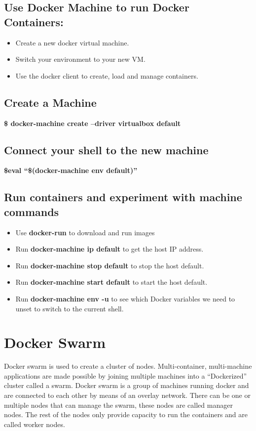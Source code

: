 \documentclass[12pt]{report}
\begin{document}
\subsection{Use Docker Machine to run Docker Containers:}
\begin{itemize}
	\item Create a new docker virtual machine.
	\item Switch your environment to your new VM.
	\item Use the docker client to create, load and manage containers.
\end{itemize}
\subsection{Create a Machine}
\textbf{\$ docker-machine create --driver virtualbox default}
\subsection{Connect your shell to the new machine}
\textbf{\$eval “\$(docker-machine env default)”}
\subsection{Run containers and experiment with machine commands}
\begin{itemize}
	\item Use \textbf{docker-run} to download and run images
	\item Run \textbf{docker-machine ip default} to get the host IP address.
	\item Run \textbf{docker-machine stop default} to stop the host default.
	\item Run \textbf{docker-machine start default} to start the host default.
	\item Run \textbf{docker-machine env -u} to see which Docker variables we need to unset to switch to the current shell.
\end{itemize}
\section{Docker Swarm}
Docker swarm is used to create a cluster of nodes. Multi-container, multi-machine applications are made possible by joining multiple machines into a “Dockerized” cluster called a swarm. Docker swarm is a group of machines running docker and are connected to each other by means of an overlay network. There can be one or multiple nodes that can manage the swarm, these nodes are called manager nodes. The rest of the nodes only provide capacity to run the containers and are called worker nodes. 
\end{document}
